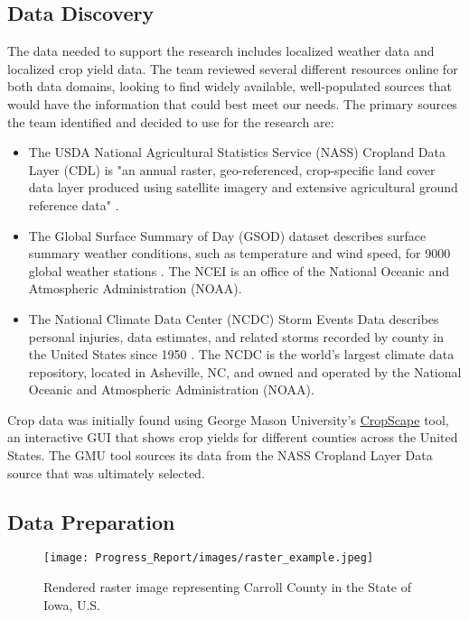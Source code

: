 \documentclass{article}
\begin{document}
\subsection{Data Discovery}
\hspace{.5cm}The data needed to support the research includes localized weather data and localized crop yield data. The team reviewed several different resources online for both data domains, looking to find widely available, well-populated sources that would have the information that could best meet our needs. The primary sources the team identified and decided to use for the research are:
\begin{itemize}
    \item The USDA National Agricultural Statistics Service (NASS) Cropland Data Layer (CDL) is "an annual raster, geo-referenced, crop-specific land cover data layer produced using satellite imagery and extensive agricultural ground reference data" \citep{NASS-CDL}.
    \item The Global Surface Summary of Day (GSOD) dataset describes surface summary weather conditions, such as temperature and wind speed, for 9000 global weather stations \citep{NOAA-NCEI}. The NCEI is an office of the National Oceanic and Atmospheric Administration (NOAA).
    \item The National Climate Data Center (NCDC) Storm Events Data describes personal injuries, data estimates, and related storms recorded by county in the United States since 1950 \citep{NOAA-NCDC}. The NCDC is the world's largest climate data repository, located in Asheville, NC, and owned and operated by the National Oceanic and Atmospheric Administration (NOAA).
\end{itemize}

Crop data was initially found using George Mason University's \href{https://nassgeodata.gmu.edu/CropScape/}{CropScape} tool, an interactive GUI that shows crop yields for different counties across the United States. The GMU tool sources its data from the NASS Cropland Layer Data source that was ultimately selected. 

\subsection{Data Preparation}

\begin{wrapfigure}{l}{0.5\textwidth}
  \begin{center}
    \label{sec:raster}
    \vspace*{-8mm}
    \texttt{[image: Progress\_Report/images/raster\_example.jpeg]}
  \end{center}
  \vspace*{-5mm}
  \caption{Rendered raster image representing Carroll County in the State of Iowa, U.S. \citep{RemoteSens}}
  \vspace*{-2mm}
\end{wrapfigure}
\end{document}
